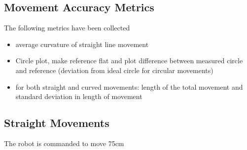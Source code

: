 \subsection{Movement Accuracy Metrics}
The following metrics have been collected

\begin{itemize}
	\item average curvature of straight line movement
	\item Circle plot, make reference flat and plot difference between measured circle and reference (deviation from ideal circle for circular movements)
	\item for both straight and curved movements: length of the total movement and  standard deviation in length of movement
\end{itemize}


\subsection{Straight Movements}

The robot is commanded to move 75cm

